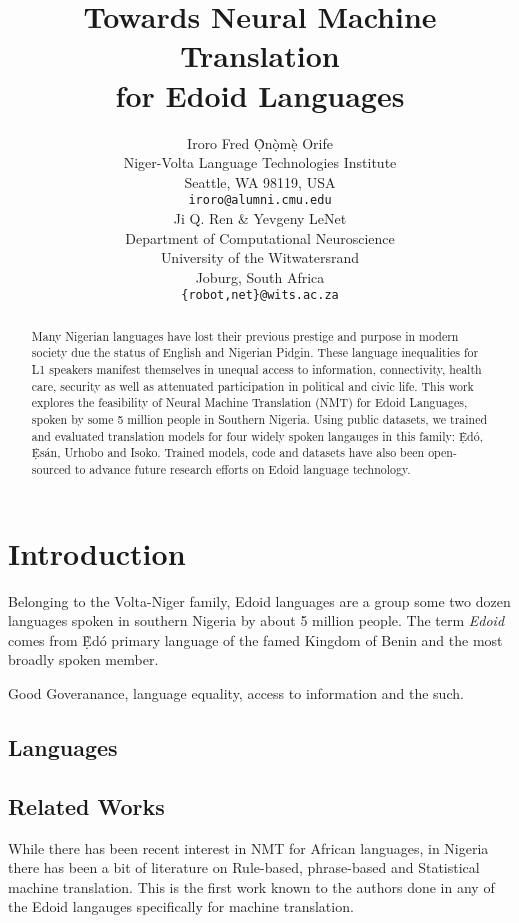 \documentclass{article} %
\title{Towards Neural Machine Translation \\ for Edoid Languages}
\author{Iroro Fred \d{\`O}n\d{\`o}m\d{\`e} Orife \\
Niger-Volta Language Technologies Institute\\
Seattle, WA 98119, USA \\
\texttt{iroro@alumni.cmu.edu} \\
\And
Ji Q. Ren \& Yevgeny LeNet \\
Department of Computational Neuroscience \\
University of the Witwatersrand \\
Joburg, South Africa \\
\texttt{\{robot,net\}@wits.ac.za} \\
}
\begin{document}
\maketitle

\begin{abstract}
Many Nigerian languages have lost their previous prestige and purpose in modern society due the status of English and Nigerian Pidgin. These language inequalities for L1 speakers manifest themselves in unequal access to information, connectivity, health care, security as well as attenuated participation in political and civic life. This work explores the feasibility of Neural Machine Translation (NMT) for Edoid Languages, spoken by some 5 million people in Southern Nigeria. Using public datasets, we trained and evaluated translation models for four widely spoken langauges in this family: \d{\`E}d{\'o}, \d{\`E}s{\'a}n, Urhobo and Isoko. Trained models, code and datasets have also been open-sourced to advance future research efforts on Edoid language technology.\\


\end{abstract}

\section{Introduction}

Belonging to the Volta-Niger family, Edoid languages are a group some two dozen languages spoken in southern Nigeria by about 5 million people. The term \emph{Edoid} comes from \d{\`E}d{\'o} primary language of the famed Kingdom of Benin and the most broadly spoken member. 


Good Goveranance, language equality, access to information and the such.

\subsection{Languages}


\subsection{Related Works}

While there has been recent interest in NMT for African languages, in Nigeria there has been a bit of literature on Rule-based, phrase-based and Statistical machine translation. This is the first work known to the authors done in any of the Edoid langauges specifically for machine translation.
\end{document}
